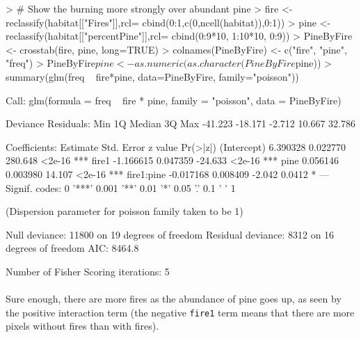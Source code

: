 \documentclass{article}
\begin{document}
\begin{Schunk}
\begin{Sinput}
> # Show the burning more strongly over abundant pine
> fire <- reclassify(habitat[["Fires"]],rcl= cbind(0:1,c(0,ncell(habitat)),0:1))
> pine <- reclassify(habitat[["percentPine"]],rcl= cbind(0:9*10, 1:10*10, 0:9))
> PineByFire <- crosstab(fire, pine, long=TRUE)
> colnames(PineByFire) <- c("fire", "pine", "freq")
> PineByFire$pine <- as.numeric(as.character(PineByFire$pine))
> summary(glm(freq ~ fire*pine, data=PineByFire, family="poisson"))
\end{Sinput}
\begin{Soutput}
Call:
glm(formula = freq ~ fire * pine, family = "poisson", data = PineByFire)

Deviance Residuals: 
    Min       1Q   Median       3Q      Max  
-41.223  -18.171   -2.712   10.667   32.786  

Coefficients:
             Estimate Std. Error z value Pr(>|z|)    
(Intercept)  6.390328   0.022770 280.648   <2e-16 ***
fire1       -1.166615   0.047359 -24.633   <2e-16 ***
pine         0.056146   0.003980  14.107   <2e-16 ***
fire1:pine  -0.017168   0.008409  -2.042   0.0412 *  
---
Signif. codes:  0 '***' 0.001 '**' 0.01 '*' 0.05 '.' 0.1 ' ' 1

(Dispersion parameter for poisson family taken to be 1)

    Null deviance: 11800  on 19  degrees of freedom
Residual deviance:  8312  on 16  degrees of freedom
AIC: 8464.8

Number of Fisher Scoring iterations: 5
\end{Soutput}
\end{Schunk}

\paragraph{}
Sure enough, there are more fires as the abundance of pine goes up, as seen by the positive interaction term (the negative \texttt{fire1} term means that there are more pixels without fires than with fires).
\end{document}

